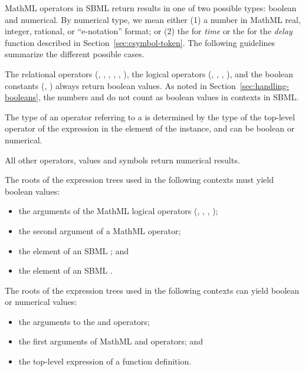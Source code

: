 MathML operators in SBML return results in one of two
possible types: boolean and numerical.  By numerical type,
we mean either (1) a number in MathML real, integer, rational, or
``e-notation'' format; or (2) the  for \emph{time}
or the  for the \emph{delay} function described in
Section~\ref{sec:csymbol-token}.  The following guidelines
summarize the different possible cases.

The relational operators (, , ,
, , ), the logical operators
(, , , ), and the
boolean constants (, ) always return
boolean values.  As noted in
  Section~\ref{sec:handling-booleans}, the numbers  and
   do not count as boolean values in \mathml
  contexts in SBML.

The type of an operator referring to a \FunctionDefinition is
determined by the type of the top-level operator of the expression
in the  element of the \FunctionDefinition
instance, and can be boolean or numerical.

All other operators, values and symbols return numerical
results.

The roots of the expression trees used in the following contexts
must yield boolean values:

\begin{itemize}\setlength{\parskip}{-0.2ex}

\item the arguments of the MathML logical operators (,
, , );

\item the second argument of a MathML  operator;

\item the  element of an SBML \Event; and

\item the  element of an SBML \Constraint.

\end{itemize}

The roots of the expression trees used in the following contexts can
yield boolean or numerical values:

\begin{itemize}\setlength{\parskip}{-0.2ex}

\item the arguments to the  and  operators;

\item the first arguments of MathML  and 
operators; and

\item the top-level expression of a function definition.

\end{itemize}

